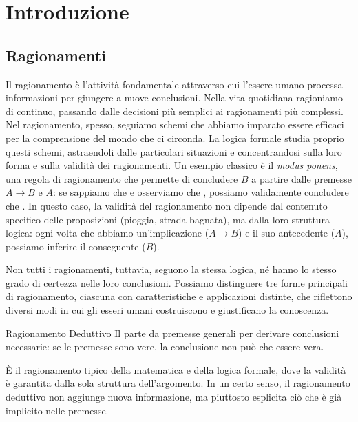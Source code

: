 \chapter{Introduzione}

\section{Ragionamenti}

Il ragionamento è l'attività fondamentale attraverso cui l'essere umano processa informazioni per giungere a nuove conclusioni.
Nella vita quotidiana ragioniamo di continuo, passando dalle decisioni più semplici ai ragionamenti più complessi. Nel ragionamento, spesso, seguiamo schemi che abbiamo imparato essere efficaci per la comprensione del mondo che ci circonda.
La logica formale studia proprio questi schemi, astraendoli dalle particolari situazioni e concentrandosi sulla loro forma e sulla validità dei ragionamenti.
Un esempio classico è il \textit{modus ponens}, una regola di ragionamento che permette di concludere \(B\) a partire dalle premesse \(A \rightarrow B\) e \(A\): se sappiamo che  e osserviamo che , possiamo validamente concludere che .
In questo caso, la validità del ragionamento non dipende dal contenuto specifico delle proposizioni (pioggia, strada bagnata), ma dalla loro struttura logica: ogni volta che abbiamo un'implicazione (\(A \rightarrow B\)) e il suo antecedente (\(A\)), possiamo inferire il conseguente (\(B\)).

Non tutti i ragionamenti, tuttavia, seguono la stessa logica, né hanno lo stesso grado di certezza nelle loro conclusioni.
Possiamo distinguere tre forme principali di ragionamento, ciascuna con caratteristiche e applicazioni distinte, che riflettono diversi modi in cui gli esseri umani costruiscono e giustificano la conoscenza.

\begin{definition}{Ragionamento Deduttivo}
  Il  parte da premesse generali per derivare conclusioni necessarie: se le premesse sono vere, la conclusione non può che essere vera.
\end{definition}

È il ragionamento tipico della matematica e della logica formale, dove la validità è garantita dalla sola struttura dell'argomento.
In un certo senso, il ragionamento deduttivo non aggiunge nuova informazione, ma piuttosto esplicita ciò che è già implicito nelle premesse.

